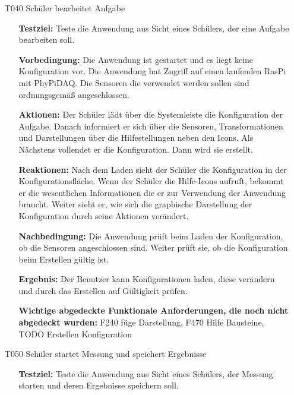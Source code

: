 \documentclass[parskip=full]{scrartcl}
\begin{document}
\begin{itemize}
\begin{itemize}
\end{itemize}

\item[T040] Schüler bearbeitet Aufgabe
\begin{itemize}

\item []\textbf{Testziel:} Teste die Anwendung aus Sicht eines Schülers, der eine Aufgabe bearbeiten soll.

\item []\textbf{Vorbedingung:} Die Anwendung ist gestartet und es liegt keine Konfiguration vor. Die Anwendung hat Zugriff auf einen laufenden \gls{RasPi} mit \gls{PhyPiDAQ}. Die Sensoren die verwendet werden sollen sind ordnungsgemäß angeschlossen.

\item []\textbf{Aktionen:} Der Schüler lädt über die Systemleiste die Konfiguration der Aufgabe. Danach informiert er sich über die Sensoren, Transformationen und Darstellungen über die Hilfestellungen neben den Icons. Als Nächstens vollendet er die Konfiguration. Dann wird sie erstellt. 
\item []\textbf{Reaktionen:} Nach dem Laden sieht der Schüler die Konfiguration in der Konfigurationsfläche. Wenn der Schüler die Hilfe-Icons aufruft, bekommt er die wesentlichen Informationen die er zur Verwendung der Anwendung braucht. Weiter sieht er, wie sich die graphische Darstellung der Konfiguration durch seine Aktionen verändert. 
\item []\textbf{Nachbedingung:} Die Anwendung prüft beim Laden der Konfiguration, ob die Sensoren angeschlossen sind. Weiter prüft sie, ob die Konfiguration beim Erstellen gültig ist. 


\item []\textbf{Ergebnis:} Der Benutzer kann Konfigurationen laden, diese verändern und durch das Erstellen auf Gültigkeit prüfen. 
\item []\textbf{Wichtige abgedeckte Funktionale Anforderungen, die noch nicht abgedeckt wurden:} F240 füge Darstellung, F470 Hilfe Bausteine, TODO Erstellen Konfiguration

\end{itemize}

\item[T050] Schüler startet Messung und speichert Ergebnisse
\begin{itemize}

\item []\textbf{Testziel:} Teste die Anwendung aus Sicht eines Schülers, der Messung starten und deren Ergebnisse speichern soll.


\end{itemize}
\end{itemize}
\end{document}

